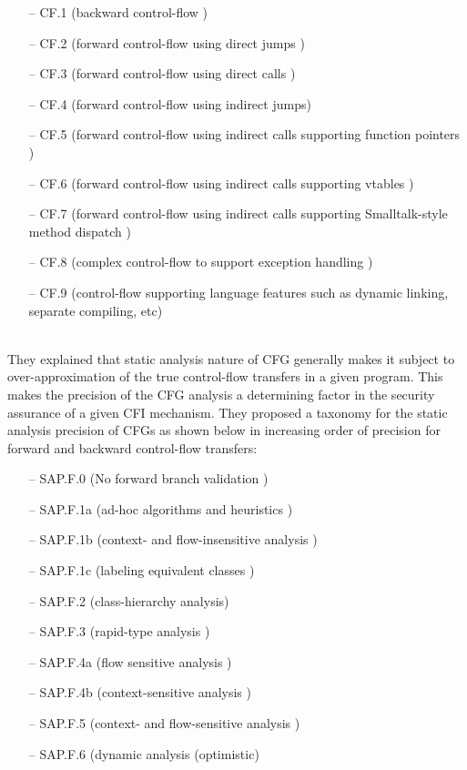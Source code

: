 \documentclass[dvips,12pt]{article}
\begin{document}
\begin{itemize}[noitemsep,nolistsep]
\item[--] CF.1 (backward control-flow )
\item[--] CF.2 (forward control-flow using direct jumps )
\item[--] CF.3 (forward control-flow using direct calls )
\item[--] CF.4 (forward control-flow using indirect jumps)
\item[--] CF.5 (forward control-flow using indirect calls supporting function pointers )
\item[--] CF.6 (forward control-flow using indirect calls supporting vtables )
\item[--] CF.7 (forward control-flow using indirect calls supporting Smalltalk-style method dispatch )
\item[--] CF.8 (complex control-flow to support exception handling )
\item[--] CF.9 (control-flow supporting language features such as dynamic linking, separate compiling, etc)
\end{itemize}
\ \\
They explained that static analysis nature of CFG generally makes it subject to over-approximation of the true control-flow transfers in a given program. This makes the precision of the CFG analysis a determining factor in the security assurance of a given CFI mechanism. They proposed a taxonomy for the static analysis precision of CFGs as shown below in increasing order of precision for forward and backward control-flow transfers:
\newline
\begin{itemize}[noitemsep,nolistsep]
\item[--] SAP.F.0  (No forward branch validation )
\item[--] SAP.F.1a (ad-hoc algorithms and heuristics )
\item[--] SAP.F.1b (context- and flow-insensitive analysis )
\item[--] SAP.F.1c (labeling equivalent classes )
\item[--] SAP.F.2  (class-hierarchy analysis)
\item[--] SAP.F.3  (rapid-type analysis )
\item[--] SAP.F.4a (flow sensitive analysis )
\item[--] SAP.F.4b (context-sensitive analysis )
\item[--] SAP.F.5  (context- and flow-sensitive analysis )
\item[--] SAP.F.6  (dynamic analysis (optimistic)
\end{itemize}
\end{document}
